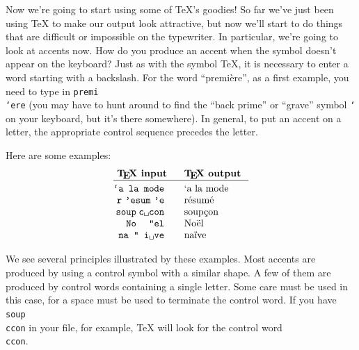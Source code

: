 Now we're going to start using some of \TeX{}'s goodies! So far 
we've just been using \TeX{} to make our output look attractive, 
but now we'll start to do things that are difficult or impossible 
on the typewriter. In particular, we're going to look at accents 
now. How do you produce an accent when the symbol doesn't appear on 
the keyboard? Just as with the symbol \TeX{}, it is necessary to 
enter a word starting with a backslash. For the word ``premi\`ere'', 
as a first example, you need to type in {\tt premi\\`ere} 
(you may have to hunt around to find the ``back prime'' 
or ``grave'' symbol {\tt `} on your keyboard, but it's there 
somewhere). In general, to put an accent 
on a letter, the appropriate control sequence precedes the letter. 

Here are some examples: 
$$\vbox{ 

\halign{ 
\strut \hfil\tt # & \quad # \hfil\cr 
\bf \TeX{} input & \bf \TeX{} output \cr 
\noalign{\hrule} \noalign{\smallskip} 
\\`a la mode          & \`a la mode \cr 
r\\'esum\\'e          & r\'esum\'e  \cr 
soup\\c{\sp}con   & soup\c con  \cr 
No\\"el               & No\"el      \cr 
na\\"\\i{\sp}ve    & na\"\i ve   \cr 
} 
}$$ 


We see several principles illustrated by these examples. Most 
accents are produced by using a control symbol with a similar 
shape. A few of them are produced by control words containing a 
single letter. Some care must be used in this case, for a space 
must be used to terminate the control word. If you have {\tt 
soup\\ccon} in your file, for example, \TeX{} will look for the 
control word {\tt\\ccon}. 

